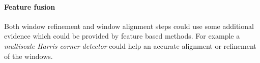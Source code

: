 \paragraph{Feature fusion}
Both window refinement and window alignment steps could use some additional
evidence which could be provided by feature based methods.  For example a
\emph{multiscale Harris corner detector} could help an accurate alignment or
refinement of the windows.











% 
% 
% 
% 
% 
% 
% 
% 
